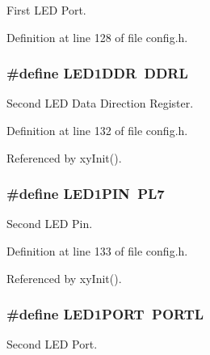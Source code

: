 First L\-E\-D Port. 



Definition at line 128 of file config.\-h.

\hypertarget{group__config_gab0f33b52cdb68e643eba6cf583fb625f}{
\subsubsection[{L\-E\-D1\-D\-D\-R}]{\setlength{\rightskip}{0pt plus 5cm}\#define L\-E\-D1\-D\-D\-R~D\-D\-R\-L}}\label{group__config_gab0f33b52cdb68e643eba6cf583fb625f}


Second L\-E\-D Data Direction Register. 



Definition at line 132 of file config.\-h.



Referenced by xy\-Init().

\hypertarget{group__config_ga04d7aaffbb7b5afaf49acf8a3a39e33a}{
\subsubsection[{L\-E\-D1\-P\-I\-N}]{\setlength{\rightskip}{0pt plus 5cm}\#define L\-E\-D1\-P\-I\-N~P\-L7}}\label{group__config_ga04d7aaffbb7b5afaf49acf8a3a39e33a}


Second L\-E\-D Pin. 



Definition at line 133 of file config.\-h.



Referenced by xy\-Init().

\hypertarget{group__config_ga3931891a757b08dbdfeaa8afd4dcb664}{
\subsubsection[{L\-E\-D1\-P\-O\-R\-T}]{\setlength{\rightskip}{0pt plus 5cm}\#define L\-E\-D1\-P\-O\-R\-T~P\-O\-R\-T\-L}}\label{group__config_ga3931891a757b08dbdfeaa8afd4dcb664}


Second L\-E\-D Port. 



